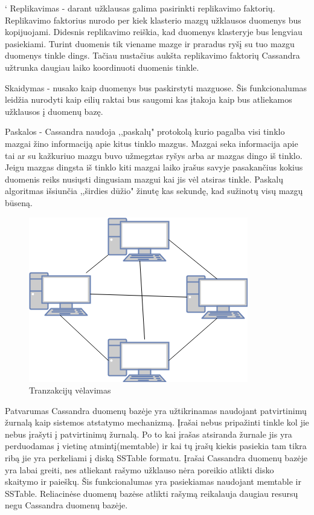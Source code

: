 \documentclass{VUMIFPSkursinis}
\begin{document}
` Replikavimas - darant užklausas galima pasirinkti replikavimo faktorių. Replikavimo faktorius nurodo per kiek klasterio mazgų užklausos duomenys bus kopijuojami. Didesnis replikavimo reiškia, kad duomenys klasteryje bus lengviau pasiekiami. Turint duomenis tik viename mazge ir praradus ryšį su tuo mazgu duomenys tinkle dings. Tačiau nustačius aukšta replikavimo faktorių Cassandra užtrunka daugiau laiko koordinuoti duomenis tinkle. 
\par
Skaidymas - nusako kaip duomenys bus paskirstyti mazguose. Šis funkcionalumas leidžia nurodyti kaip eilių raktai bus saugomi kas įtakoja kaip bus atliekamos užklausos į duomenų bazę.
\par
Paskalos - Cassandra naudoja ,,paskalų" protokolą kurio pagalba visi tinklo mazgai žino informaciją apie kitus tinklo mazgus. Mazgai seka informacija apie tai ar su kažkuriuo mazgu buvo užmegztas ryšys arba ar mazgas dingo iš tinklo. Jeigu mazgas dingsta iš tinklo kiti mazgai laiko įrašus savyje pasakančius kokius duomenis reiks nusiųsti dingusiam mazgui kai jis vėl atsiras tinkle. Paskalų algoritmas išsiunčia ,,širdies dūžio" žinutę kas sekundę, kad sužinotų visų mazgų būseną.
\begin{figure}[H]
\centering
\includegraphics[scale=0.6]{img/Gos}
\caption{Tranzakcijų vėlavimas} %
\label{img:mlp}
\end{figure}

Patvarumas Cassandra duomenų bazėje yra užtikrinamas naudojant patvirtinimų žurnalą kaip sistemos atstatymo mechanizmą. Įrašai nebus pripažinti tinkle kol jie nebus įrašyti į patvirtinimų žurnalą. Po to kai įrašas atsiranda žurnale jis yra perduodamas į vietinę atmintį(memtable) ir kai tų įrašų kiekis pasiekia tam tikra ribą jie yra perkeliami į diską SSTable formatu.
\linebreak
Įrašai Cassandra duomenų bazėje yra labai greiti, nes atliekant rašymo užklauso nėra poreikio atlikti disko skaitymo ir paieškų. Šis funkcionalumas yra pasiekiamas naudojant memtable ir SSTable. Reliacinėse duomenų bazėse atlikti rašymą reikalauja daugiau resursų negu Cassandra duomenų bazėje.
\end{document}
